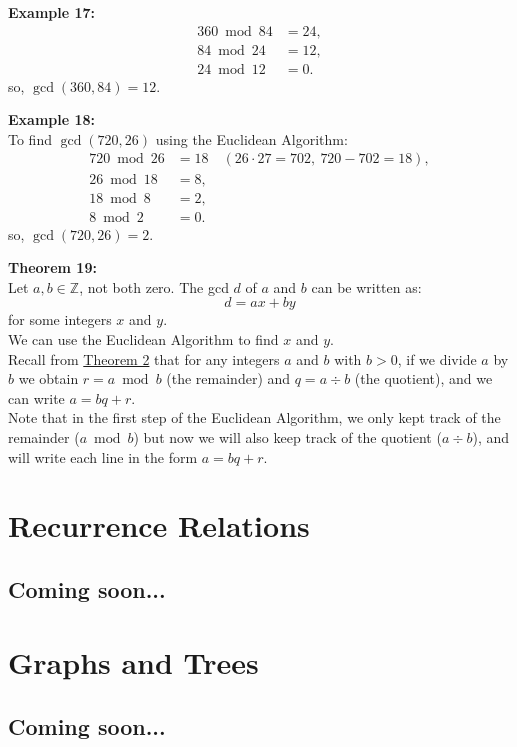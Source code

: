 \documentclass[12pt]{article}
\begin{document}
\noindent\textbf{Example 17:}
\label{ex:euclid360}
\begin{align*}
360 \bmod 84 &= 24, \\
84 \bmod 24 &= 12, \\
24 \bmod 12 &= 0.
\end{align*}
so, $\gcd(360,84) = 12$.

\vspace{5mm}

\noindent\textbf{Example 18:}
\label{ex:euclid720}
\\To find $\gcd(720,26)$ using the Euclidean Algorithm:
\begin{align*}
720 \bmod 26 &= 18 \quad(26\cdot 27 = 702,\ 720-702=18), \\   
26 \bmod 18 &= 8, \\
18 \bmod 8 &= 2, \\
8 \bmod 2 &= 0.
\end{align*}
so, $\gcd(720,26) = 2$.

\newpage
\noindent\textbf{Theorem 19:}
\label{thm:bezout}
\\Let $a,b \in \mathbb{Z}$, not both zero. 
The gcd $d$ of $a$ and $b$ can be written as:
\[
d = ax + by
\]
for some integers $x$ and $y$.  
\\We can use the Euclidean Algorithm to find $x$ and $y$.  
\\Recall from \hyperref[thm:division]{Theorem 2} that for any integers 
$a$ and $b$ with $b>0$, if we divide $a$ by $b$ we obtain $r=a \bmod b$ (the remainder) and $q=a \div b$ (the quotient), and we can write $a=bq+r$.
\\Note that in the first step of the Euclidean Algorithm, we only kept track of the 
remainder ($a \bmod b$) but now we will also keep track of the quotient ($a \div b$),
and will write each line in the form $a=bq+r$.

\newpage
\section{Recurrence Relations}
\subsection*{Coming soon...}

\newpage
\section{Graphs and Trees}
\subsection*{Coming soon...}
\end{document}
